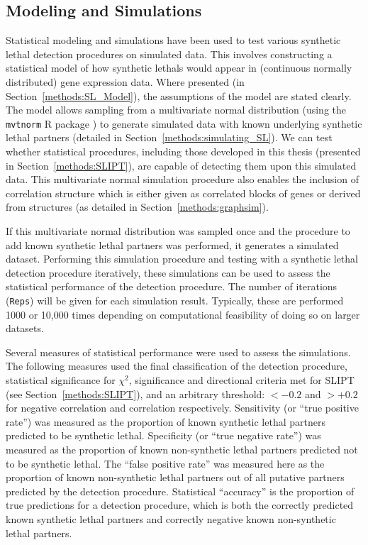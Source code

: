 \subsection{Modeling and Simulations} \label{methods:simulation}
Statistical modeling and simulations have been used to test various \gls{synthetic lethal} detection procedures on simulated data. This involves constructing a statistical model of how \glspl{synthetic lethal} would appear in (continuous normally distributed) \gls{gene expression} data. Where presented (in Section~\ref{methods:SL_Model}), the assumptions of the model are stated clearly. The model allows sampling from a multivariate normal distribution (using the \texttt{mvtnorm} R package \citep{Genz2009, mvtnorm}) to generate simulated data with known underlying \gls{synthetic lethal} partners (detailed in Section~\ref{methods:simulating_SL}). We can test whether statistical procedures, including those developed in this thesis (presented in Section~\ref{methods:SLIPT}), are capable of detecting them upon this simulated data. This multivariate normal simulation procedure also enables the inclusion of correlation structure which is either given as correlated blocks of genes or derived from  structures (as detailed in Section~\ref{methods:graphsim}).

If this multivariate normal distribution was sampled once and the procedure to add known \gls{synthetic lethal} partners was performed, it generates a simulated dataset. Performing this simulation procedure and testing with a \gls{synthetic lethal} detection procedure iteratively, these simulations can be used to assess the statistical performance of the detection procedure. The number of iterations (\texttt{Reps}) will be given for each simulation result. Typically, these are performed 1000 or 10,000 times depending on computational feasibility of doing so on larger datasets. 

Several measures of statistical performance were used to assess the simulations. The following measures used the final classification of the detection procedure, statistical significance for $\chi^2$, significance and directional criteria met for \gls{SLIPT} (see Section~\ref{methods:SLIPT}), and an arbitrary threshold: $<-0.2$ and $>+0.2$ for  negative correlation and correlation respectively. Sensitivity (or ``true positive rate'') was measured as the proportion of known \gls{synthetic lethal} partners predicted to be \gls{synthetic lethal}. Specificity (or ``true negative rate'') was measured as the proportion of known non-synthetic lethal partners predicted not to be \gls{synthetic lethal}. The ``false positive rate'' was measured here as the proportion of known non-synthetic lethal partners out of all putative partners predicted by the detection procedure. Statistical ``accuracy'' is the proportion of true predictions for a detection procedure, which is both the correctly predicted known \gls{synthetic lethal} partners and correctly negative known non-synthetic lethal partners.

